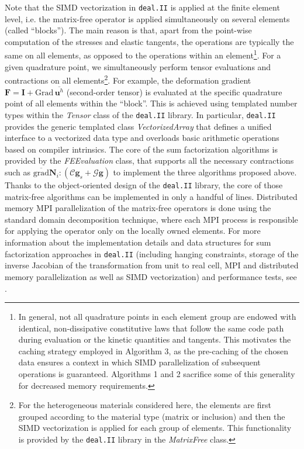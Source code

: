 \documentclass[AMA,STIX1COL]{WileyNJD-v2}
\newcommand*{\gz}[1]{\boldsymbol{#1}}
\newcommand*{\Grad}{\mathrm{Grad}}
\newcommand*{\grad}{\mathrm{grad}}
\begin{document}
Note that the SIMD vectorization
in \texttt{deal.II} \cite{dealII90}
is applied at the finite element level, i.e. the matrix-free operator is applied simultaneously on several elements (called ``blocks'').
The main reason is that, apart from the point-wise computation of the stresses and elastic tangents, the operations are typically the same on all elements{\color{red}, as opposed to the operations within an element}\footnote{%
In general, not all quadrature points in each element group are endowed with identical, non-dissipative constitutive laws that follow the same code path during evaluation or the kinetic quantities and tangents.
This motivates the caching strategy employed in Algorithm 3, as the pre-caching of the chosen data ensures a context in which SIMD parallelization of subsequent operations is guaranteed.
Algorithms 1 and 2 sacrifice some of this generality for decreased memory requirements.
}.
For a given quadrature point, we simultaneously perform tensor evaluations and contractions on all elements\footnote{%
For the heterogeneous materials considered here,
the elements are first grouped according to the material type (matrix or inclusion) and then the SIMD vectorization is applied for each group of elements.
This functionality is provided by the \texttt{deal.II} library in the \textit{MatrixFree} class.
}.
For example, the deformation gradient $\gz F = \gz I + \Grad \, \overline{\gz u^h}$ (second-order tensor) is evaluated at the specific quadrature point of all elements within the ``block''.
This is achieved using templated number types within the \textit{Tensor} class of the \texttt{deal.II} library.
In particular, \texttt{deal.II} provides the generic templated class \textit{VectorizedArray} that defines a unified interface to a vectorized data type
and overloads basic arithmetic operations based on compiler intrinsics.
The core of the sum factorization algorithms is provided by the
\textit{FEEvaluation} class, that supports all the necessary contractions such as $\overline{\grad} \gz N_i : (\boldsymbol{\mathcal{C}}\gz g_s  + \boldsymbol{\mathcal{G}} \gz g)$ to implement the three algorithms proposed above.
Thanks to the object-oriented design of the \texttt{deal.II} library, the core of those matrix-free algorithms can be implemented in only a handful of lines.
Distributed memory MPI parallelization of the matrix-free operators is done using the standard domain decomposition technique, where each MPI process is responsible for applying the operator only on the locally owned elements.
For more information about the implementation details and data structures for sum factorization approaches in \texttt{deal.II} (including hanging constraints, storage of the inverse Jacobian of the transformation from unit to real cell, MPI and distributed memory parallelization as well as SIMD vectorization) and performance tests, see \cite{kronbichler12}.
\end{document}
